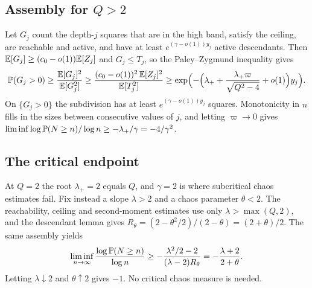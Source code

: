 \subsection{Assembly for \texorpdfstring{$Q>2$}{Q>2}}

Let $G_j$ count the depth-$j$ squares that are in the high band, satisfy the ceiling, are
reachable and active, and have at least $e^{(\gamma-o(1))y_j}$ active descendants. Then
$\mathbb{E}[G_j]\ge(c_0-o(1))\mathbb{E}[Z_j]$ and $G_j\le T_j$, so the Paley--Zygmund inequality gives
\[
\mathbb{P}(G_j>0)\ge\frac{\mathbb{E}[G_j]^2}{\mathbb{E}[G_j^2]}\ge\frac{(c_0-o(1))^2\,\mathbb{E}[Z_j]^2}{\mathbb{E}[T_j^2]}
\ge\exp\Bigl(-\Bigl(\lambda_++\frac{\lambda_+\varpi}{\sqrt{Q^2-4}}+o(1)\Bigr)y_j\Bigr).
\]
On $\{G_j>0\}$ the subdivision has at least $e^{(\gamma-o(1))y_j}$ squares. Monotonicity in $n$
fills in the sizes between consecutive values of $j$, and letting $\varpi\to0$ gives
$\liminf\log\mathbb{P}(N\ge n)/\log n\ge-\lambda_+/\gamma=-4/\gamma^2$.

\subsection{The critical endpoint}

At $Q=2$ the root $\lambda_+=2$ equals $Q$, and $\gamma=2$ is where subcritical chaos estimates
fail. Fix instead a slope $\lambda>2$ and a chaos parameter $\theta<2$. The reachability, ceiling
and second-moment estimates use only $\lambda>\max(Q,2)$, and the descendant lemma gives
$R_\theta=(2-\theta^2/2)/(2-\theta)=(2+\theta)/2$. The same assembly yields
\[
\liminf_{n\to\infty}\frac{\log\mathbb{P}(N\ge n)}{\log n}\ge-\frac{\lambda^2/2-2}{(\lambda-2)R_\theta}
=-\frac{\lambda+2}{2+\theta}.
\]
Letting $\lambda\downarrow2$ and $\theta\uparrow2$ gives $-1$. No critical chaos measure is needed.
